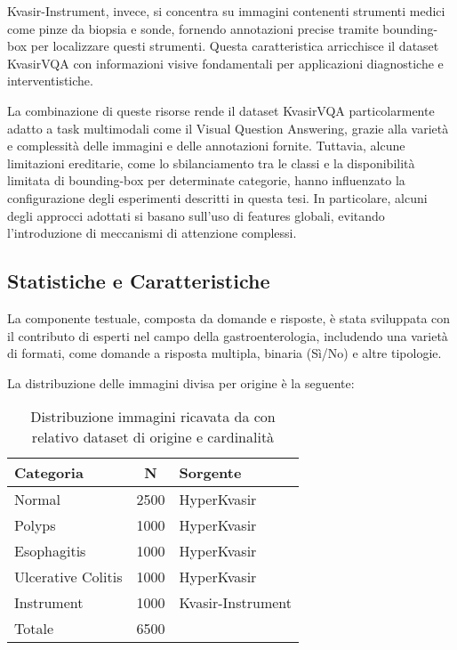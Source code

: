 \documentclass[../main.tex]{subfiles}
\begin{document}
Kvasir-Instrument, invece, si concentra su immagini contenenti strumenti medici come pinze da biopsia e sonde, fornendo annotazioni precise tramite bounding-box per localizzare questi strumenti. Questa caratteristica arricchisce il dataset KvasirVQA con informazioni visive fondamentali per applicazioni diagnostiche e interventistiche.

La combinazione di queste risorse rende il dataset KvasirVQA particolarmente adatto a task multimodali come il Visual Question Answering, grazie alla varietà e complessità delle immagini e delle annotazioni fornite. 
Tuttavia, alcune limitazioni ereditarie, come lo sbilanciamento tra le classi e la disponibilità limitata di bounding-box per determinate categorie, hanno influenzato la configurazione degli esperimenti descritti in questa tesi. 
In particolare, alcuni degli approcci adottati si basano sull'uso di features globali, evitando l'introduzione di meccanismi di attenzione complessi.

\subsection{Statistiche e Caratteristiche}

La componente testuale, composta da domande e risposte, è stata sviluppata con il contributo di esperti nel campo della gastroenterologia, includendo una varietà di formati, come domande a risposta multipla, binaria (Sì/No) e altre tipologie.

La distribuzione delle immagini divisa per origine è la seguente:

\begin{table}[H]
    \centering
    \begin{tabular}{|l|c|l|}
    \hline
    \textbf{Categoria} &
    \textbf{N} &
    \textbf{Sorgente} \\ \hline
    Normal             & 2500            & HyperKvasir                   \\ \hline
    Polyps             & 1000            & HyperKvasir                   \\ \hline
    Esophagitis        & 1000             & HyperKvasir                   \\ \hline
    Ulcerative Colitis          & 1000             & HyperKvasir             \\ \hline
    Instrument   &   1000    &   Kvasir-Instrument \\ \hline
    Totale      &       6500        & \\ \hline
    \end{tabular}
    \caption{Distribuzione immagini ricavata da \cite{gautam2024kvasirvqa} con relativo dataset di origine e cardinalità}
    \label{tab:my_label}
\end{table}
\end{document}
